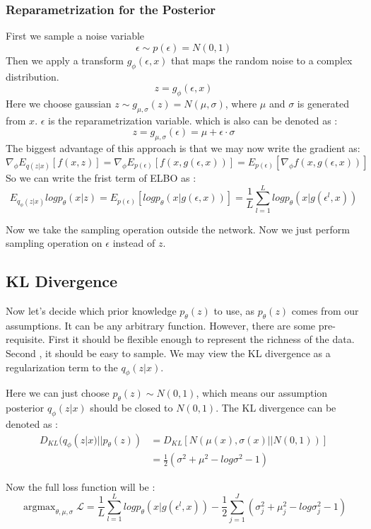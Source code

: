 \documentclass{article}
\begin{document}
\subsubsection{Reparametrization for the Posterior } 
First we sample a noise variable 
$$\epsilon \sim p(\epsilon)= N(0,1)$$
Then we apply a transform $g_{\phi}(\epsilon,x)$ that maps the random noise to a complex distribution. 
$$z=g_{\phi}(\epsilon,x)$$
Here we choose gaussian $z\sim g_{\mu,\sigma}(z)=N(\mu,\sigma)$, where $\mu$ and $\sigma$ is generated from $x$. $\epsilon$ is the reparametrization variable. which is also can be denoted as :
$$z=g_{\mu,\sigma}(\epsilon)=\mu+\epsilon \cdot \sigma$$
The biggest advantage of this approach is that we may now write the gradient as:
$$\nabla_{\phi}E_{q(z|x)}[f(x,z)]=\nabla_{\phi}E_{p(\epsilon)}[f(x,g(\epsilon,x))]=E_{p(\epsilon)}[\nabla_{\phi}f(x,g(\epsilon,x))]$$
So we can write the frist term of ELBO as :
$$E_{q_{\phi}(z|x)}logp_{\theta}(x|z)=E_{p(\epsilon)}[logp_{\theta}(x|g(\epsilon,x))]=\frac{1}{L}\sum_{l=1}^{L}logp_{\theta}(x|g(\epsilon^{l},x)) $$

Now we take the sampling operation outside the network. Now we just perform sampling operation on $\epsilon$ instead of $z$.

\subsection{KL Divergence}
Now let's decide which prior knowledge $p_{\theta}(z)$ to use, as $p_{\theta}(z)$ comes from our assumptions. It can be any arbitrary function. However, there are some pre-requisite. First it should be flexible enough to represent the richness of the data. Second , it should be easy to sample. We may view the KL divergence as a regularization term to the $q_{\phi}(z|x)$.

Here we can just choose $p_{\theta}(z) \sim N(0,1)$, which means our assumption posterior $q_{\phi}(z|x)$ should be closed to $N(0,1)$. The KL divergence can be  denoted as :
\begin{align*}
D_{KL}(q_{\phi}(z|x)||p_{\theta}(z)) &=D_{KL}[N(\mu(x),\sigma(x)||N(0,1))] \\
&= \frac{1}{2}(\sigma^{2}+\mu^{2}-log\sigma^{2}-1)
\end{align*}

Now the full loss function will be :
$$\mathop{\arg\max}_{\theta,\mu,\sigma}\mathcal{L} =\frac{1}{L}\sum_{l=1}^{L}logp_{\theta}(x|g(\epsilon^{l},x)) -\frac{1}{2}\sum_{j=1}^{J}(\sigma_{j}^{2}+\mu_{j}^{2}-log\sigma_{j}^{2}-1)$$
\end{document}

